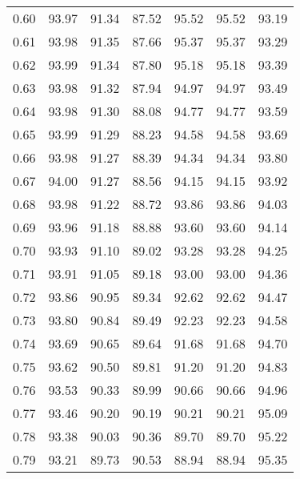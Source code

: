 \begin{tabular}{|c|c|c|c|c|c|c|}
      0.60 &     93.97 &     91.34 &      87.52 &   95.52 &      95.52 &         93.19 \\
      0.61 &     93.98 &     91.35 &      87.66 &   95.37 &      95.37 &         93.29 \\
      0.62 &     93.99 &     91.34 &      87.80 &   95.18 &      95.18 &         93.39 \\
      0.63 &     93.98 &     91.32 &      87.94 &   94.97 &      94.97 &         93.49 \\
      0.64 &     93.98 &     91.30 &      88.08 &   94.77 &      94.77 &         93.59 \\
      0.65 &     93.99 &     91.29 &      88.23 &   94.58 &      94.58 &         93.69 \\
      0.66 &     93.98 &     91.27 &      88.39 &   94.34 &      94.34 &         93.80 \\
      0.67 &     94.00 &     91.27 &      88.56 &   94.15 &      94.15 &         93.92 \\
      0.68 &     93.98 &     91.22 &      88.72 &   93.86 &      93.86 &         94.03 \\
      0.69 &     93.96 &     91.18 &      88.88 &   93.60 &      93.60 &         94.14 \\
      0.70 &     93.93 &     91.10 &      89.02 &   93.28 &      93.28 &         94.25 \\
      0.71 &     93.91 &     91.05 &      89.18 &   93.00 &      93.00 &         94.36 \\
      0.72 &     93.86 &     90.95 &      89.34 &   92.62 &      92.62 &         94.47 \\
      0.73 &     93.80 &     90.84 &      89.49 &   92.23 &      92.23 &         94.58 \\
      0.74 &     93.69 &     90.65 &      89.64 &   91.68 &      91.68 &         94.70 \\
      0.75 &     93.62 &     90.50 &      89.81 &   91.20 &      91.20 &         94.83 \\
      0.76 &     93.53 &     90.33 &      89.99 &   90.66 &      90.66 &         94.96 \\
      0.77 &     93.46 &     90.20 &      90.19 &   90.21 &      90.21 &         95.09 \\
      0.78 &     93.38 &     90.03 &      90.36 &   89.70 &      89.70 &         95.22 \\
      0.79 &     93.21 &     89.73 &      90.53 &   88.94 &      88.94 &         95.35 \\

\end{tabular}
